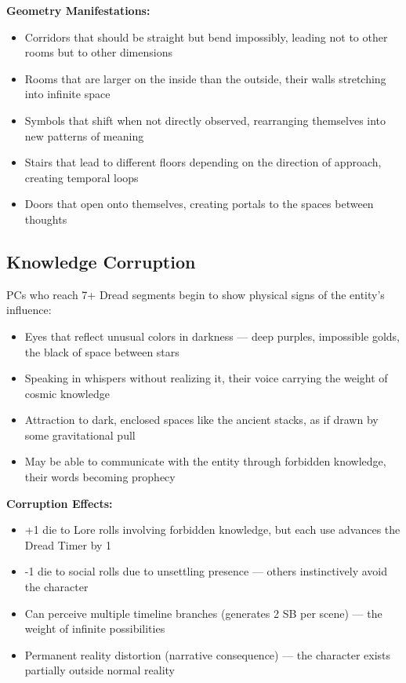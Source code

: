 \documentclass[11pt]{article}
\begin{document}
\textbf{Geometry Manifestations:}
\begin{itemize}
\item Corridors that should be straight but bend impossibly, leading not to other rooms but to other dimensions
\item Rooms that are larger on the inside than the outside, their walls stretching into infinite space
\item Symbols that shift when not directly observed, rearranging themselves into new patterns of meaning
\item Stairs that lead to different floors depending on the direction of approach, creating temporal loops
\item Doors that open onto themselves, creating portals to the spaces between thoughts
\end{itemize}

\subsection{Knowledge Corruption}

PCs who reach 7+ Dread segments begin to show physical signs of the entity's influence:
\begin{itemize}
\item Eyes that reflect unusual colors in darkness --- deep purples, impossible golds, the black of space between stars
\item Speaking in whispers without realizing it, their voice carrying the weight of cosmic knowledge
\item Attraction to dark, enclosed spaces like the ancient stacks, as if drawn by some gravitational pull
\item May be able to communicate with the entity through forbidden knowledge, their words becoming prophecy
\end{itemize}

\textbf{Corruption Effects:}
\begin{itemize}
\item +1 die to Lore rolls involving forbidden knowledge, but each use advances the Dread Timer by 1
\item -1 die to social rolls due to unsettling presence --- others instinctively avoid the character
\item Can perceive multiple timeline branches (generates 2 SB per scene) --- the weight of infinite possibilities
\item Permanent reality distortion (narrative consequence) --- the character exists partially outside normal reality
\end{itemize}
\end{document}
